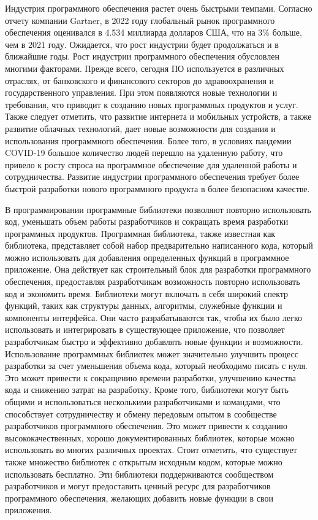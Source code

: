
{\actuality} Индустрия программного обеспечения растет очень быстрыми темпами. Согласно отчету компании Gartner, в 2022 году глобальный рынок программного обеспечения оценивался в 4.534 миллиарда долларов США, что на 3\% больше, чем в 2021 году. Ожидается, что рост индустрии будет продолжаться и в ближайшие годы. Рост индустрии программного обеспечения обусловлен многими факторами. Прежде всего, сегодня ПО используется в различных отраслях, от банковского и финансового секторов до здравоохранения и государственного управления. При этом появляются новые технологии и требования, что приводит к созданию новых программных продуктов и услуг. Также следует отметить, что развитие интернета и мобильных устройств, а также развитие облачных технологий, дает новые возможности для создания и использования программного обеспечения. Более того, в условиях пандемии COVID-19 большое количество людей перешло на удаленную работу, что привело к росту спроса на программное обеспечение для удаленной работы и сотрудничества. Развитие индустрии программного обеспечения требует более быстрой разработки нового программного продукта в более безопасном качестве. 

В программировании программные библиотеки позволяют повторно использовать код, уменьшать объем работы разработчиков и сокращать время разработки программных продуктов. Программная библиотека, также известная как библиотека, представляет собой набор предварительно написанного кода, который можно использовать для добавления определенных функций в программное приложение. Она действует как строительный блок для разработки программного обеспечения, предоставляя разработчикам возможность повторно использовать код и экономить время.
Библиотеки могут включать в себя широкий спектр функций, таких как структуры данных, алгоритмы, служебные функции и компоненты интерфейса. Они часто разрабатываются так, чтобы их было легко использовать и интегрировать в существующее приложение, что позволяет разработчикам быстро и эффективно добавлять новые функции и возможности.
Использование программных библиотек может значительно улучшить процесс разработки за счет уменьшения объема кода, который необходимо писать с нуля. Это может привести к сокращению времени разработки, улучшению качества кода и снижению затрат на разработку. Кроме того, библиотеки могут быть общими и использоваться несколькими разработчиками и командами, что способствует сотрудничеству и обмену передовым опытом в сообществе разработчиков программного обеспечения. Это может привести к созданию высококачественных, хорошо документированных библиотек, которые можно использовать во многих различных проектах.
Стоит отметить, что существует также множество библиотек с открытым исходным кодом, которые можно использовать бесплатно. Эти библиотеки поддерживаются сообществом разработчиков и могут предоставить ценный ресурс для разработчиков программного обеспечения, желающих добавить новые функции в свои приложения. 

